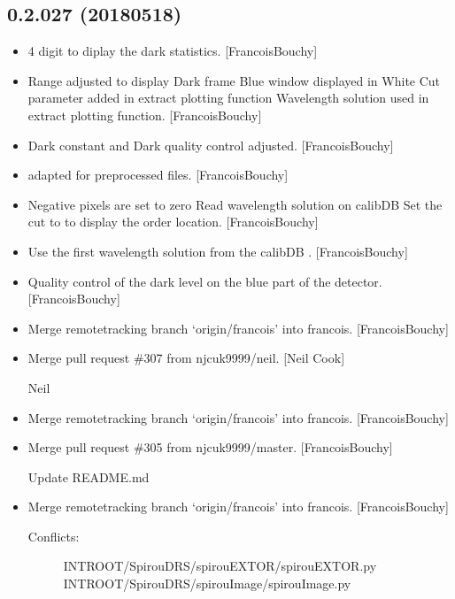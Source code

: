 \documentclass[a4paper,10pt,english]{report}
\begin{document}
\subsection{0.2.027 (2018\sphinxhyphen{}05\sphinxhyphen{}18)}
\label{\detokenize{misc/changelog:id453}}\begin{itemize}
\item {} 
4 digit to diplay the dark statistics. {[}FrancoisBouchy{]}

\item {} 
Range adjusted to display Dark frame Blue window displayed in White
Cut parameter added in extract plotting function Wavelength solution
used in extract plotting function. {[}FrancoisBouchy{]}

\item {} 
Dark constant and Dark quality control adjusted. {[}FrancoisBouchy{]}

\item {} 
 adapted for preprocessed files. {[}FrancoisBouchy{]}

\item {} 
Negative pixels are set to zero Read wavelength solution on calibDB
Set the cut to  to display the order location.
{[}FrancoisBouchy{]}

\item {} 
Use the first wavelength solution from the calibDB
. {[}FrancoisBouchy{]}

\item {} 
Quality control of the dark level on the blue part of the detector.
{[}FrancoisBouchy{]}

\item {} 
Merge remote\sphinxhyphen{}tracking branch ‘origin/francois’ into francois.
{[}FrancoisBouchy{]}

\item {} 
Merge pull request \#307 from njcuk9999/neil. {[}Neil Cook{]}

Neil

\item {} 
Merge remote\sphinxhyphen{}tracking branch ‘origin/francois’ into francois.
{[}FrancoisBouchy{]}

\item {} 
Merge pull request \#305 from njcuk9999/master. {[}FrancoisBouchy{]}

Update README.md

\item {} 
Merge remote\sphinxhyphen{}tracking branch ‘origin/francois’ into francois.
{[}FrancoisBouchy{]}
\begin{description}
\item[{Conflicts:}] \leavevmode
INTROOT/SpirouDRS/spirouEXTOR/spirouEXTOR.py
INTROOT/SpirouDRS/spirouImage/spirouImage.py

\end{description}

\end{itemize}
\end{document}

